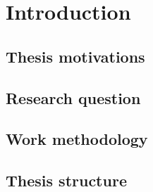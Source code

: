 \chapter{Introduction} \label{Introduction}

\section{Thesis motivations}

\section{Research question}

\section{Work methodology}

\section{Thesis structure}
